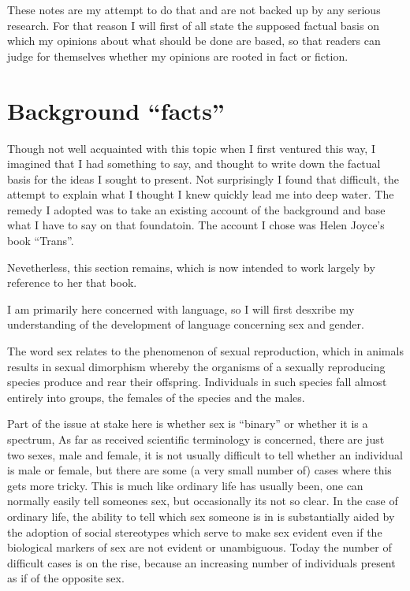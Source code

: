 \documentclass[10pt,titlepage]{article}
\begin{document}
These notes are my attempt to do that and are not backed up by any serious research.
For that reason I will first of all state the supposed factual basis on which my opinions about what should be done are based, so that readers can judge for themselves whether my opinions are rooted in fact or fiction.

\section{Background ``facts''}

Though not well acquainted with this topic when I first ventured this way, I imagined that I had something to say, and thought to write down the factual basis for the ideas I sought to present.
Not surprisingly I found that difficult, the attempt to explain what I thought I knew quickly lead me into deep water.
The remedy I adopted was to take an existing account of the background and base what I have to say on that foundatoin.
The account I chose was Helen Joyce's book ``Trans''\cite{joyce2021}.

Nevetherless, this section remains, which is now intended to work largely by reference to her that book.

I am primarily here concerned with language, so I will first desxribe my understanding of the development of language concerning sex and gender.

The word sex relates to the phenomenon of sexual reproduction, which in animals results in sexual dimorphism whereby the organisms of a sexually reproducing species produce and rear their offspring.
Individuals in such species fall almost entirely into groups, the females of the species and the males.

Part of the issue at stake here is whether sex is ``binary'' or whether it is a spectrum,
As far as received scientific terminology is concerned, there are just two sexes, male and female, it is not usually difficult to tell whether an individual is male or female, but there are some (a very small number of) cases where this gets more tricky.
This is much like ordinary life has usually been, one can normally easily tell someones sex, but occasionally its not so clear.
In the case of ordinary life, the ability to tell which sex someone is in is substantially aided by the adoption of social stereotypes which serve to make sex evident even if the biological markers of sex are not evident or unambiguous.
Today the number of difficult cases is on the rise, because an increasing number of individuals present as if of the opposite sex.
\end{document}
